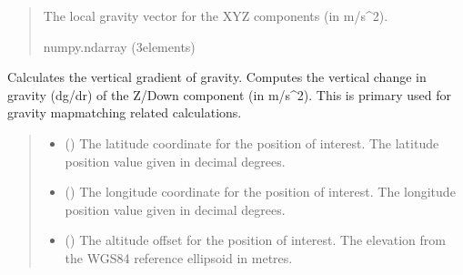 \documentclass[letterpaper,10pt,english]{sphinxmanual}
\begin{document}
\begin{fulllineitems}
\begin{fulllineitems}
\begin{quote}
\begin{description}
\sphinxAtStartPar
The local gravity vector for the XYZ components (in m/s\textasciicircum{}2).

\sphinxAtStartPar
numpy.ndarray (3\sphinxhyphen{}elements)

\end{description}\end{quote}

\end{fulllineitems}


\begin{fulllineitems}
\label{\detokenize{modules/gravity/base:qnav.gravity.base.GravityModel.calc_vertical_grad}}
\pysigstartsignatures
{}
\pysigstopsignatures
\sphinxAtStartPar
Calculates the vertical gradient of gravity.
Computes the vertical change in gravity (dg/dr) of the Z/Down
component (in m/s\textasciicircum{}2). This is primary used for gravity map\sphinxhyphen{}matching
related calculations.
\begin{quote}\begin{description}
\begin{itemize}
\item {} 
\sphinxAtStartPar
{} () \textendash{} The latitude coordinate for the position of interest.
The latitude position value given in decimal degrees.

\item {} 
\sphinxAtStartPar
{} () \textendash{} The longitude coordinate for the position of interest.
The longitude position value given in decimal degrees.

\item {} 
\sphinxAtStartPar
{} () \textendash{} The altitude offset for the position of interest.
The elevation from the WGS\sphinxhyphen{}84 reference ellipsoid in metres.


\end{itemize}
\end{description}
\end{quote}
\end{fulllineitems}
\end{fulllineitems}
\end{document}
